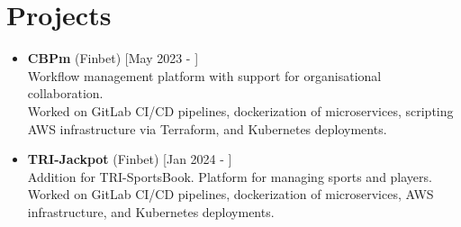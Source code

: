 \documentclass[a4paper]{moderncv}
\begin{document}
\section{Projects}	

		\begin{itemize}
			\item \textbf{CBPm} (Finbet) \hfill[May 2023 - ]\\
			Workflow management platform with support for organisational collaboration. \\
			Worked on GitLab CI/CD pipelines, dockerization of microservices, scripting AWS infrastructure via Terraform, and Kubernetes deployments.
			
			\item \textbf{TRI-Jackpot} (Finbet) \hfill[Jan 2024 - ]\\
			Addition for TRI-SportsBook. Platform for managing sports and players. \\
			Worked on GitLab CI/CD pipelines, dockerization of microservices, AWS infrastructure, and Kubernetes deployments.

			
			


\end{itemize}
\end{document}
